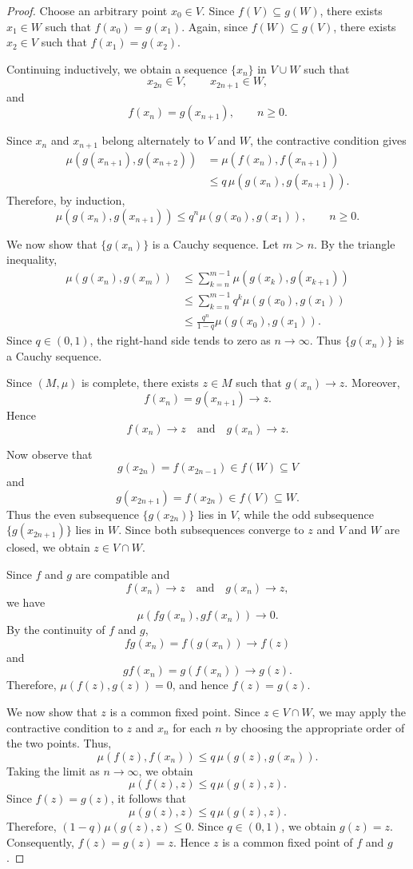 \documentclass[11pt,a4paper,margin=1in]{amsart}
\theoremstyle{plain}
\theoremstyle{definition}
\theoremstyle{remark}
\begin{document}
\begin{proof}
Choose an arbitrary point $x_0\in V$. Since $f(V)\subseteq g(W)$, 
there exists $x_1\in W$ such that $f(x_0)=g(x_1)$. Again, since $f(W)\subseteq g(V)$, 
there exists $x_2\in V$ such that $f(x_1)=g(x_2)$. 

Continuing inductively, we obtain a sequence $\{x_n\}$ in $V\cup W$
such that
\[
x_{2n}\in V,\qquad x_{2n+1}\in W,
\]
and
\[
f(x_n)=g(x_{n+1}),
\qquad n\geq0.
\]

Since $x_n$ and $x_{n+1}$ belong alternately to $V$ and $W$, the
contractive condition gives
\[
\begin{aligned}
\mu(g(x_{n+1}),g(x_{n+2}))
&=
\mu(f(x_n),f(x_{n+1}))\\
&\leq
q\,\mu(g(x_n),g(x_{n+1})).
\end{aligned}
\]
Therefore, by induction,
\[
\mu(g(x_n),g(x_{n+1}))
\leq
q^n\mu(g(x_0),g(x_1)),
\qquad n\geq0.
\]

We now show that $\{g(x_n)\}$ is a Cauchy sequence. Let $m>n$. By the
triangle inequality,
\[
\begin{aligned}
\mu(g(x_n),g(x_m))
&\leq
\sum_{k=n}^{m-1}
\mu(g(x_k),g(x_{k+1}))\\
&\leq
\sum_{k=n}^{m-1}
q^k\mu(g(x_0),g(x_1))\\
&\leq
\frac{q^n}{1-q}\mu(g(x_0),g(x_1)).
\end{aligned}
\]
Since $q\in(0,1)$, the right-hand side tends to zero as $n\to\infty$.
Thus $\{g(x_n)\}$ is a Cauchy sequence.

Since $(M,\mu)$ is complete, there exists $z\in M$ such that $g(x_n)\longrightarrow z$. Moreover,
\[
f(x_n)=g(x_{n+1})\longrightarrow z.
\]
Hence
\[
f(x_n)\longrightarrow z
\quad\text{and}\quad
g(x_n)\longrightarrow z.
\]

Now observe that
\[
g(x_{2n})=f(x_{2n-1})\in f(W)\subseteq V
\]
and
\[
g(x_{2n+1})=f(x_{2n})\in f(V)\subseteq W.
\]
Thus the even subsequence $\{g(x_{2n})\}$ lies in $V$, while the odd
subsequence $\{g(x_{2n+1})\}$ lies in $W$. Since both subsequences
converge to $z$ and $V$ and $W$ are closed, we obtain $z\in V\cap W$. 

Since $f$ and $g$ are compatible and
\[
f(x_n)\longrightarrow z
\quad\text{and}\quad
g(x_n)\longrightarrow z,
\]
we have
\[
\mu(fg(x_n),gf(x_n))\longrightarrow0.
\]
By the continuity of $f$ and $g$,
\[
fg(x_n)=f(g(x_n))\longrightarrow f(z)
\]
and
\[
gf(x_n)=g(f(x_n))\longrightarrow g(z).
\]
Therefore, $\mu(f(z),g(z))=0$, 
and hence $f(z)=g(z)$. 

We now show that $z$ is a common fixed point. Since $z\in V\cap W$, we
may apply the contractive condition to $z$ and $x_n$ for each $n$ by
choosing the appropriate order of the two points. Thus,
\[
\mu(f(z),f(x_n))
\leq
q\,\mu(g(z),g(x_n)).
\]
Taking the limit as $n\to\infty$, we obtain
\[
\mu(f(z),z)
\leq
q\,\mu(g(z),z).
\]
Since $f(z)=g(z)$, it follows that
\[
\mu(g(z),z)
\leq
q\,\mu(g(z),z).
\]
Therefore, $(1-q)\mu(g(z),z)\leq0$. 
Since $q\in(0,1)$, we obtain $g(z)=z$. 
Consequently, $f(z)=g(z)=z$. Hence $z$ is a common fixed point of $f$ and $g$.


\end{proof}
\end{document}
